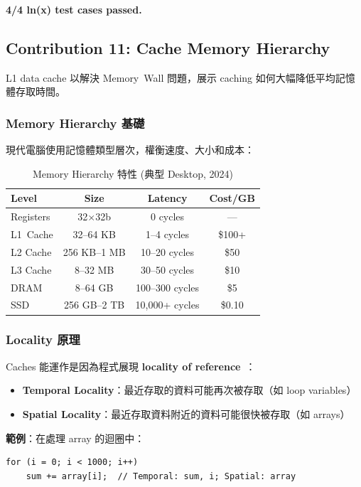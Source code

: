 \documentclass[journal]{IEEEtran}
\newcommand{\tagit}[1]{\textit{#1}}
\newcommand{\Goal}{\tagit{目標：}}
\begin{document}
\textbf{4/4 ln(x) test cases passed.}

\subsection{Contribution 11: Cache Memory Hierarchy}

 L1 data cache 以解決 Memory~Wall 問題，展示 caching 如何大幅降低平均記憶體存取時間。

\subsubsection{Memory Hierarchy 基礎}
現代電腦使用記憶體類型層次，權衡速度、大小和成本：

\begin{table}[!t]
\centering
\caption{Memory Hierarchy 特性 (典型 Desktop, 2024)}
\footnotesize
\begin{tabular}{@{}lccc@{}}
\toprule
\textbf{Level} & \textbf{Size} & \textbf{Latency} & \textbf{Cost/GB} \\
\midrule
Registers & 32$\times$32b & 0 cycles & --- \\
L1~Cache & 32--64 KB & 1--4 cycles & \$100+ \\
L2 Cache & 256 KB--1 MB & 10--20 cycles & \$50 \\
L3 Cache & 8--32 MB & 30--50 cycles & \$10 \\
DRAM & 8--64 GB & 100--300 cycles & \$5 \\
SSD & 256 GB--2 TB & 10,000+ cycles & \$0.10 \\
\bottomrule
\end{tabular}
\end{table}

\subsubsection{Locality 原理}
Caches 能運作是因為程式展現 \textbf{locality of reference}~\cite{hennessy2017computer}：
\begin{itemize}
    \item \textbf{Temporal Locality}：最近存取的資料可能再次被存取（如 loop variables）
    \item \textbf{Spatial Locality}：最近存取資料附近的資料可能很快被存取（如 arrays）
\end{itemize}

\textbf{範例}：在處理 array 的迴圈中：
\begin{lstlisting}
for (i = 0; i < 1000; i++)
    sum += array[i];  // Temporal: sum, i; Spatial: array
\end{lstlisting}
\end{document}
